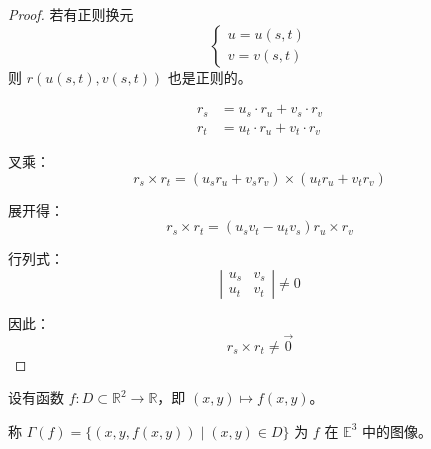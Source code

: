 \documentclass[lang=cn,10pt,thmcnt=section]{elegantbook}
\begin{document}
\begin{proof}
        若有正则换元
    $$
    \begin{cases}
    u = u(s, t) \\
    v = v(s, t)
    \end{cases}
    $$
    则 $r(u(s,t), v(s,t))$ 也是正则的。
    
    $$
    \begin{aligned}
    r_s &= u_s \cdot r_u + v_s \cdot r_v \\
    r_t &= u_t \cdot r_u + v_t \cdot r_v
    \end{aligned}
    $$
    
    叉乘：
    $$
    r_s \times r_t = (u_s r_u + v_s r_v) \times (u_t r_u + v_t r_v)
    $$
    
    展开得：
    $$
    r_s \times r_t = (u_s v_t - u_t v_s) r_u \times r_v
    $$
    
    行列式：
    $$
    \left| \begin{matrix} u_s & v_s \\ u_t & v_t \end{matrix} \right| \neq 0
    $$
    
    因此：
    $$
    r_s \times r_t \neq \vec{0}
    $$
\end{proof} 
\begin{definition}[图像]
    设有函数 $f: D \subset \mathbb{R}^2 \rightarrow \mathbb{R}$，即 $(x, y) \mapsto f(x, y)$。
    
    称 $\Gamma(f) = \{(x, y, f(x, y)) \mid (x, y) \in D\}$ 为 $f$ 在 $\mathbb{E}^3$ 中的图像。
\end{definition}
    
\end{document}
